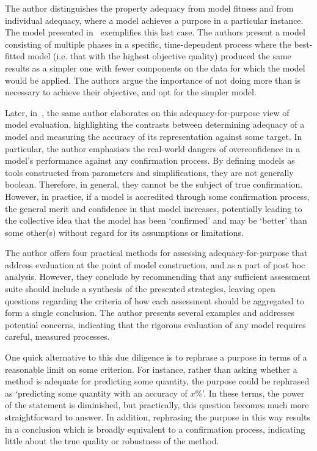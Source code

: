 The author distinguishes the property adequacy from model fitness and from
individual adequacy, where a model achieves a purpose in a particular instance.
The model presented in~\cite{Knight2012} exemplifies this last case. The authors
present a model consisting of multiple phases in a specific, time-dependent
process where the best-fitted model (i.e. that with the highest objective
quality) produced the same results as a simpler one with fewer components on the
data for which the model would be applied. The authors argue the importance of
not doing more than is necessary to achieve their objective, and opt for the
simpler model.

Later, in~\cite{Parker2020}, the same author elaborates on this
adequacy-for-purpose view of model evaluation, highlighting the contrasts
between determining adequacy of a model and measuring the accuracy of its
representation against some target. In particular, the author emphasises the
real-world dangers of overconfidence in a model's performance against any
confirmation process. By defining models as tools constructed from parameters
and simplifications, they are not generally boolean. Therefore, in general, they
cannot be the subject of true confirmation. However, in practice, if a model is
accredited through some confirmation process, the general merit and confidence
in that model increases, potentially leading to the collective idea that the
model has been `confirmed' and may be `better' than some other(s) without regard
for its assumptions or limitations.

The author offers four practical methods for assessing adequacy-for-purpose that
address evaluation at the point of model construction, and as a part of post hoc
analysis. However, they conclude by recommending that any sufficient assessment
suite should include a synthesis of the presented strategies, leaving open
questions regarding the criteria of how each assessment should be aggregated to
form a single conclusion. The author presents several examples and addresses
potential concerns, indicating that the rigorous evaluation of any model
requires careful, measured processes.

One quick alternative to this due diligence is to rephrase a purpose in terms of
a reasonable limit on some criterion. For instance, rather than asking whether a
method is adequate for predicting some quantity, the purpose could be rephrased
as `predicting some quantity with an accuracy of \(x\)\%'. In these terms, the
power of the statement is diminished, but practically, this question becomes
much more straightforward to answer. In addition, rephrasing the purpose in this
way results in a conclusion which is broadly equivalent to a confirmation
process, indicating little about the true quality or robustness of the method.

